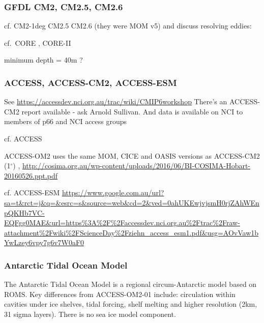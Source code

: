 \documentclass[11pt]{article}
\begin{document}
\subsubsection{GFDL CM2, CM2.5, CM2.6}
cf. CM2-1deg CM2.5 CM2.6 (they were MOM v5) and discuss resolving eddies: \citet{GriffiesWintonAndersonBensonDelworthDufourDunneGoddardMorrison2015a}
\citet{DelworthRosatiAndersonAdcroftBalajiBensonDixonGriffiesLee2012a}
\citet{DunneJohnAdcroftGriffiesHallbergShevliakovaStoufferCookeDunne2012a}
\citet{Griffies2015a}

cf.\ CORE \citep{GriffiesBiastochBoningBryanDanabasogluChassignetEnglandGerdesHaak2009a}, CORE-II \citep{DanabasogluYeagerBaileyBehrensBentsenBiBiastochBoningBozec2014a}

minimum depth = 40m ?

\subsubsection{ACCESS, ACCESS-CM2, ACCESS-ESM}
See \url{https://accessdev.nci.org.au/trac/wiki/CMIP6workshop}
There's an ACCESS-CM2 report available - ask Arnold Sullivan.
And data is available on NCI to members of p66 and NCI access groups


cf. ACCESS \citet{BiDixMarslandOFarrellRashidUotilaHirstKowalczykGolebiewski2013a, BiMarslandUotilaOFarrellFiedlerSullivanGriffiesZhouHirst2013a, DixVohralikBiRashidMarslandOFarrellUotilaHirstKowalczyk2013a}

\citet{BiMarslandUotilaOFarrellFiedlerSullivanGriffiesZhouHirst2013a}

ACCESS-OM2 uses the same MOM, CICE and OASIS versions as ACCESS-CM2 (1$^\circ$) \citet{BiYanSullivan2016a}, \url{http://cosima.org.au/wp-content/uploads/2016/06/BI-COSIMA-Hobart-20160526.ppt.pdf}

cf. ACCESS-ESM \url{https://www.google.com.au/url?sa=t&rct=j&q=&esrc=s&source=web&cd=2&ved=0ahUKEwjvjsmH0rjZAhWEnpQKHb7VC-EQFgg0MAE&url=https%3A%2F%2Faccessdev.nci.org.au%2Ftrac%2Fraw-attachment%2Fwiki%2FScienceDay%2Fziehn_access_esm1.pdf&usg=AOvVaw1bYwLzey6vpy7g6v7W0aF0}

\subsubsection{Antarctic Tidal Ocean Model}
The Antarctic Tidal Ocean Model is a regional circum-Antarctic model based on ROMS. Key differences from ACCESS-OM2-01 include: circulation within cavities under ice shelves, tidal forcing, shelf melting and  higher resolution (2km, 31 sigma layers). There is no sea ice model component.
\end{document}
